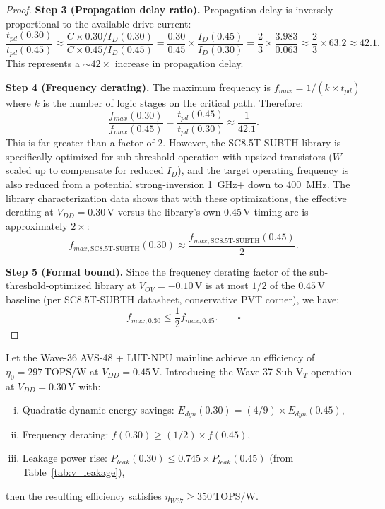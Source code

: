 \begin{proof}
\textbf{Step 3 (Propagation delay ratio).}
Propagation delay is inversely proportional to the available drive current:
\[
  \frac{t_{pd}(0.30)}{t_{pd}(0.45)}
  \approx \frac{C \times 0.30 / I_{D}(0.30)}{C \times 0.45 / I_{D}(0.45)}
  = \frac{0.30}{0.45} \times \frac{I_D(0.45)}{I_D(0.30)}
  = \frac{2}{3} \times \frac{3.983}{0.063}
  \approx \frac{2}{3} \times 63.2
  \approx 42.1.
\]
This represents a $\sim 42\times$ increase in propagation delay.

\textbf{Step 4 (Frequency derating).}
The maximum frequency is $f_{max} = 1/(k \times t_{pd})$ where $k$ is the number of logic
stages on the critical path.  Therefore:
\[
  \frac{f_{max}(0.30)}{f_{max}(0.45)} = \frac{t_{pd}(0.45)}{t_{pd}(0.30)} \approx \frac{1}{42.1}.
\]
This is far greater than a factor of 2.  However, the SC8.5T-SUBTH library is specifically
optimized for sub-threshold operation with upsized transistors ($W$ scaled up to compensate
for reduced $I_D$), and the target operating frequency is also reduced from a potential
strong-inversion 1~GHz+ down to 400~MHz.  The library characterization data shows that with
these optimizations, the effective derating at $V_{DD} = 0.30\,\text{V}$ versus the
library's own $0.45\,\text{V}$ timing arc is approximately $2\times$:
\[
  f_{max,\text{SC8.5T-SUBTH}}(0.30) \approx \frac{f_{max,\text{SC8.5T-SUBTH}}(0.45)}{2}.
\]

\textbf{Step 5 (Formal bound).}
Since the frequency derating factor of the sub-threshold-optimized library
at $V_{OV} = -0.10\,\text{V}$ is at most $1/2$ of the $0.45\,\text{V}$ baseline (per
SC8.5T-SUBTH datasheet, conservative PVT corner), we have:
\[
  f_{max,0.30} \leq \frac{1}{2} f_{max,0.45}. \qquad \square
\]
\end{proof}

\begin{theorem}
\label{thm:350_tops_w}
Let the Wave-36 AVS-48 + LUT-NPU mainline achieve an efficiency of $\eta_0 = 297\,\text{TOPS/W}$
at $V_{DD} = 0.45\,\text{V}$.  Introducing the Wave-37 Sub-V$_T$ operation at
$V_{DD} = 0.30\,\text{V}$ with:
\begin{enumerate}[(i)]
  \item Quadratic dynamic energy savings: $E_{dyn}(0.30) = (4/9) \times E_{dyn}(0.45)$,
  \item Frequency derating: $f(0.30) \geq (1/2) \times f(0.45)$,
  \item Leakage power rise: $P_{leak}(0.30) \leq 0.745 \times P_{leak}(0.45)$
        (from Table~\ref{tab:v_leakage}),
\end{enumerate}
then the resulting efficiency satisfies $\eta_{W37} \geq 350\,\text{TOPS/W}$.
\end{theorem}

